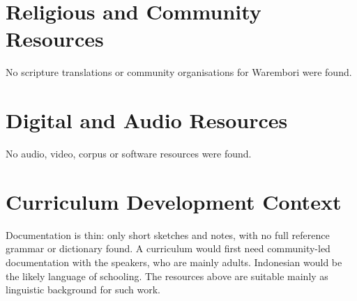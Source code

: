 \documentclass[12pt]{article}
\begin{document}
\section{Religious and Community Resources}
No scripture translations or community organisations for Warembori were found.

\section{Digital and Audio Resources}
No audio, video, corpus or software resources were found.

\section{Curriculum Development Context}
Documentation is thin: only short sketches and notes, with no full reference grammar or dictionary found. A curriculum would first need community-led documentation with the speakers, who are mainly adults. Indonesian would be the likely language of schooling. The resources above are suitable mainly as linguistic background for such work.
\end{document}
